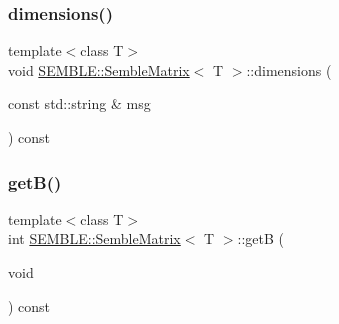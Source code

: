 \mbox{\label{structSEMBLE_1_1SembleMatrix_ab778c582ca37ce69f2f9ab1074af0ca6}} 
\subsubsection{\texorpdfstring{dimensions()}{dimensions()}\hspace{0.1cm}{\footnotesize\ttfamily [2/2]}}
{\footnotesize\ttfamily template$<$class T$>$ \\
void \mbox{\hyperlink{structSEMBLE_1_1SembleMatrix}{S\+E\+M\+B\+L\+E\+::\+Semble\+Matrix}}$<$ T $>$\+::dimensions (\begin{DoxyParamCaption}\item[{const std\+::string \&}]{msg }\end{DoxyParamCaption}) const\hspace{0.3cm}{\ttfamily [inline]}}

\mbox{\label{structSEMBLE_1_1SembleMatrix_aecff047627ee656c5836dcdf873c8ad6}} 
\subsubsection{\texorpdfstring{getB()}{getB()}\hspace{0.1cm}{\footnotesize\ttfamily [1/2]}}
{\footnotesize\ttfamily template$<$class T$>$ \\
int \mbox{\hyperlink{structSEMBLE_1_1SembleMatrix}{S\+E\+M\+B\+L\+E\+::\+Semble\+Matrix}}$<$ T $>$\+::getB (\begin{DoxyParamCaption}\item[{void}]{ }\end{DoxyParamCaption}) const\hspace{0.3cm}{\ttfamily [inline]}}

